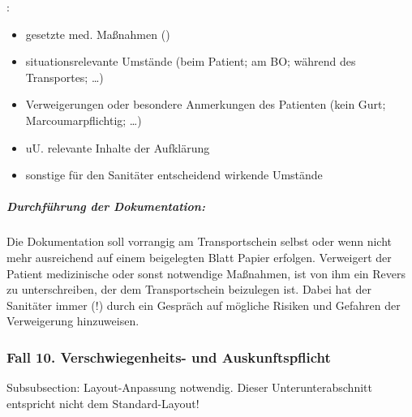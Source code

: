 {\mdseries
{}:}

\begin{itemize}
    \item gesetzte med. Ma{\ss}nahmen
    ()
    \item situationsrelevante Umstände (beim Patient; am BO; während des
    Transportes; {\dots})
    \item Verweigerungen oder besondere Anmerkungen des Patienten	(kein Gurt; Marcoumarpflichtig; {\dots})
       \item uU. relevante Inhalte der Aufklärung
       \item sonstige f\"ur den Sanitäter entscheidend wirkende Umstände
\end{itemize}



\subparagraph*{Durchf\"uhrung der Dokumentation:}
Die Dokumentation soll vorrangig am Transportschein selbst oder wenn
nicht mehr ausreichend auf einem beigelegten Blatt Papier erfolgen.
Verweigert der Patient medizinische oder sonst notwendige
Ma{\ss}nahmen, ist von ihm ein Revers zu unterschreiben, der dem
Transportschein beizulegen ist. Dabei hat der Sanitäter
immer (!) durch ein Gespräch auf m\"ogliche Risiken und Gefahren der
Verweigerung hinzuweisen.





\subsubsection{Fall 10. Verschwiegenheits- und Auskunftspflicht}
\begin{anfxwarning}[author=GABS]{Subsubsection: Layout-Anpassung notwendig.}
Dieser Unterunterabschnitt entspricht nicht dem Standard-Layout!
\end{anfxwarning}


